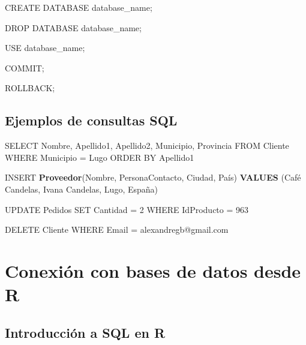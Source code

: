 \documentclass[
]{book}
\newenvironment{Shaded}{\begin{snugshade}}{\end{snugshade}}
\newcommand{\DecValTok}[1]{\textcolor[rgb]{0.00,0.00,0.81}{#1}}
\newcommand{\FunctionTok}[1]{\textcolor[rgb]{0.13,0.29,0.53}{\textbf{#1}}}
\newcommand{\NormalTok}[1]{#1}
\newcommand{\OtherTok}[1]{\textcolor[rgb]{0.56,0.35,0.01}{#1}}
\newcommand{\StringTok}[1]{\textcolor[rgb]{0.31,0.60,0.02}{#1}}
\begin{document}
\begin{Shaded}
\begin{Highlighting}[]
\NormalTok{CREATE DATABASE database\_name;}

\NormalTok{DROP DATABASE database\_name;}

\NormalTok{USE database\_name;}

\NormalTok{COMMIT;}

\NormalTok{ROLLBACK;}
\end{Highlighting}
\end{Shaded}

\subsection{Ejemplos de consultas SQL}\label{ejemplos-de-consultas-sql}

\begin{Shaded}
\begin{Highlighting}[]
\NormalTok{SELECT Nombre, Apellido1, Apellido2, Municipio, Provincia }
\NormalTok{FROM Cliente}
\NormalTok{WHERE Municipio }\OtherTok{=} \StringTok{\textquotesingle{}Lugo\textquotesingle{}}
\NormalTok{ORDER BY Apellido1}

\NormalTok{INSERT }\FunctionTok{Proveedor}\NormalTok{(Nombre, PersonaContacto, Ciudad, País)}
\FunctionTok{VALUES}\NormalTok{ (}\StringTok{\textquotesingle{}Café Candelas\textquotesingle{}}\NormalTok{, }\StringTok{\textquotesingle{}Ivana Candelas\textquotesingle{}}\NormalTok{, }\StringTok{\textquotesingle{}Lugo\textquotesingle{}}\NormalTok{, }\StringTok{\textquotesingle{}España\textquotesingle{}}\NormalTok{)}

\NormalTok{UPDATE Pedidos}
\NormalTok{SET Cantidad }\OtherTok{=} \DecValTok{2}
\NormalTok{WHERE IdProducto }\OtherTok{=} \DecValTok{963}

\NormalTok{DELETE Cliente}
\NormalTok{WHERE Email }\OtherTok{=} \StringTok{\textquotesingle{}alexandregb@gmail.com\textquotesingle{}}
\end{Highlighting}
\end{Shaded}

\section{Conexión con bases de datos desde R}\label{conexiuxf3n-con-bases-de-datos-desde-r}

\subsection{Introducción a SQL en R}\label{introducciuxf3n-a-sql-en-r}
\end{document}
